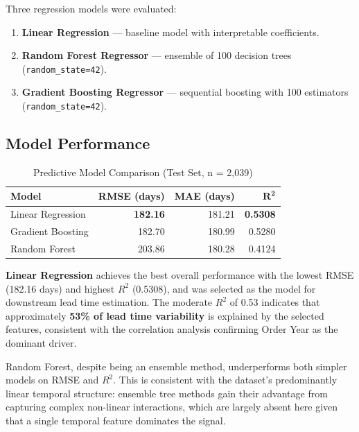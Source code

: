 \documentclass[12pt, a4paper]{article}
\begin{document}
Three regression models were evaluated:

\begin{enumerate}[leftmargin=*, label=\arabic*.]
    \item \textbf{Linear Regression} --- baseline model with
          interpretable coefficients.
    \item \textbf{Random Forest Regressor} \citep{breiman2001} ---
          ensemble of 100 decision trees (\texttt{random\_state=42}).
    \item \textbf{Gradient Boosting Regressor} \citep{friedman2001} ---
          sequential boosting with 100 estimators (\texttt{random\_state=42}).
\end{enumerate}

\subsection{Model Performance}

\begin{table}[H]
\centering
\caption{Predictive Model Comparison (Test Set, n = 2,039)}
\label{tab:model_comparison}
\renewcommand{\arraystretch}{1.2}
\begin{tabular}{lrrr}
\toprule
\textbf{Model} & \textbf{RMSE (days)} & \textbf{MAE (days)}
    & $\mathbf{R^2}$ \\
\midrule
\rowcolor{lightgray}
Linear Regression   & \textbf{182.16} & 181.21 & \textbf{0.5308} \\
Gradient Boosting   & 182.70 & 180.99 & 0.5280 \\
Random Forest       & 203.86 & 180.28 & 0.4124 \\
\bottomrule
\end{tabular}
\end{table}

\textbf{Linear Regression} achieves the best overall performance
with the lowest RMSE (182.16 days) and highest $R^2$ (0.5308),
and was selected as the model for downstream lead time estimation.
The moderate $R^2$ of 0.53 indicates that approximately
\textbf{53\% of lead time variability} is explained by the
selected features, consistent with the correlation analysis
confirming Order Year as the dominant driver.

Random Forest, despite being an ensemble method, underperforms
both simpler models on RMSE and $R^2$. This is consistent with
the dataset's predominantly linear temporal structure: ensemble
tree methods gain their advantage from capturing complex
non-linear interactions, which are largely absent here given
that a single temporal feature dominates the signal.
\end{document}
